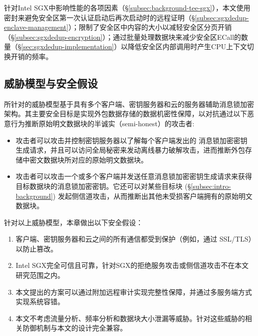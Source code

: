 针对Intel SGX中影响性能的各项因素（\S\ref{subsec:background-tee-sgx}），本文使用密封来避免安全区第一次认证启动后再次启动时的远程证明（\S\ref{subsec:sgxdedup-enclave-management}）；限制了安全区中内容的大小以减轻安全区分页开销（\S\ref{subsec:sgxdedup-encryption}）；通过批量处理数据块来减少安全区ECall的数量（\S\ref{sec:sgxdedup-implementation}）以降低安全区内部调用时产生CPU上下文切换开销的频率。

\subsection{威胁模型与安全假设}
\label{subsec:sgxdedup-threat}

\sysnameS 所针对的威胁模型基于具有多个客户端、密钥服务器和云的服务器辅助消息锁加密架构\cite{bellare2013DupLESS}。其主要安全目标是实现外包数据存储\cite{bellare2013DupLESS}的数据机密性保障，以对抗通过以下恶意行为推断原始明文数据块的半诚实（semi-honest）的攻击者:

\begin{itemize}[leftmargin=*]
    \item 攻击者可以攻击并控制密钥服务器以了解每个客户端发出的 消息锁加密密钥生成请求，并且可以访问全局秘密来发动离线暴力破解攻击\cite{bellare2013DupLESS}，进而推断外包存储中密文数据块所对应的原始明文数据块。
    \item 攻击者可以攻击一个或多个客户端并发送任意消息锁加密密钥生成请求来获得目标数据块的消息锁加密密钥\cite{bellare2013DupLESS}。它还可以对某些目标块 \cite{harnik2010side} (\S\ref{subsec:intro-background}) 发起侧信道攻击，从而推断出其他未受损客户端拥有的原始明文数据块。
\end{itemize}

针对以上威胁模型，本章做出以下安全假设：

\begin{enumerate}[leftmargin=*]
    \item 客户端、密钥服务器和云之间的所有通信都受到保护（例如，通过 SSL/TLS）以防止篡改。
    \item Intel SGX完全可信且可靠，针对SGX的拒绝服务攻击或侧信道攻击\cite{bulck2018FORESHADOW, oleksenko18}不在本文研究范围之内。
    \item 本文提出的方案可以通过附加远程审计\cite{ateniese2007provable, juels2007pors}实现完整性保障，并通过多服务端方式\cite{li15}实现系统容错。
    \item 本文不考虑流量分析\cite{zuo2018mitigating}、频率分析\cite{li2020TED}和数据块大小泄漏\cite{ritzdorf16}等威胁。针对这些威胁的相关防御机制\cite{zuo2018mitigating,li2020TED,ritzdorf16}与本文的设计完全兼容。
\end{enumerate}